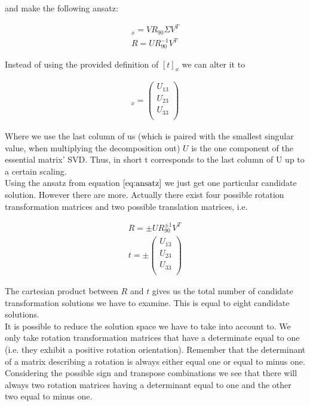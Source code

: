 \documentclass{paper}
\begin{document}
and make the following ansatz:

\begin{align}
    [t]_x = V R_{90} \Sigma V^{T} \\
    R = U R_{90}^{-1} V^{T}
\label{eq:ansatz}
\end{align}

Instead of using the provided definition of $[t]_x$ we can alter it to

\begin{align}
    [t]_x  = 
    \left(\begin{array}{r}
       U_{13} \\
       U_{23} \\  
       U_{33} \\
\end{array} \right)
\end{align}

Where we use the last column of us (which is paired with the smallest singular value, when multiplying the decomposition out) $U$ is the one component of the essential matrix' SVD. Thus, in short t corresponds to the last column of U up to a certain scaling. \\

Using the ansatz from equation $\ref{eq:ansatz}$ we just get one particular candidate solution. However there are more. Actually there exist four possible rotation transformation matrices and two possible translation matrices, i.e.

\begin{align}
    R = \pm U R_{90}^{\pm 1} V^{T} \\
    t = \pm 
        \left(\begin{array}{r}
       U_{13} \\
       U_{23} \\  
       U_{33} \\
\end{array} \right)
\end{align}

The cartesian product between $R$ and $t$ gives us the total number of candidate transformation solutions we have to examine. This is equal to eight candidate solutions. \\

It is possible to reduce the solution space we have to take into account to. We only take rotation transformation matrices that have a determinate equal to one (i.e. they exhibit a positive rotation orientation). Remember that the determinant of a matrix describing a rotation is always either equal one or equal to minus one. Considering the possible sign and transpose combinations we see that there will always two rotation matrices having a determinant equal to one and the other two equal to minus one. \\
\end{document}
